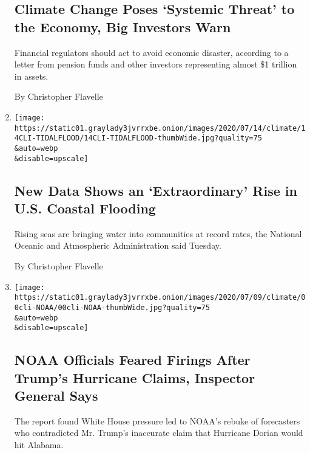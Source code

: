 \begin{enumerate}
  \hypertarget{climate-change-poses-systemic-threat-to-the-economy-big-investors-warn}{%
  \subsection{Climate Change Poses `Systemic Threat' to the Economy, Big
  Investors
  Warn}\label{climate-change-poses-systemic-threat-to-the-economy-big-investors-warn}}

  Financial regulators should act to avoid economic disaster, according
  to a letter from pension funds and other investors representing almost
  \$1 trillion in assets.

  By Christopher Flavelle
\item
  \href{/2020/07/14/climate/coastal-flooding-noaa.html}{}

  \texttt{[image: https://static01.graylady3jvrrxbe.onion/images/2020/07/14/climate/14CLI-TIDALFLOOD/14CLI-TIDALFLOOD-thumbWide.jpg?quality=75\\\&auto=webp\\\&disable=upscale]}

  \hypertarget{new-data-shows-an-extraordinary-rise-in-us-coastal-flooding}{%
  \subsection{New Data Shows an `Extraordinary' Rise in U.S. Coastal
  Flooding}\label{new-data-shows-an-extraordinary-rise-in-us-coastal-flooding}}

  Rising seas are bringing water into communities at record rates, the
  National Oceanic and Atmospheric Administration said Tuesday.

  By Christopher Flavelle
\item
  \href{/2020/07/09/climate/trump-hurricane-dorian-noaa.html}{}

  \texttt{[image: https://static01.graylady3jvrrxbe.onion/images/2020/07/09/climate/00cli-NOAA/00cli-NOAA-thumbWide.jpg?quality=75\\\&auto=webp\\\&disable=upscale]}

  \hypertarget{noaa-officials-feared-firings-after-trumps-hurricane-claims-inspector-general-says}{%
  \subsection{NOAA Officials Feared Firings After Trump's Hurricane
  Claims, Inspector General
  Says}\label{noaa-officials-feared-firings-after-trumps-hurricane-claims-inspector-general-says}}

  The report found White House pressure led to NOAA's rebuke of
  forecasters who contradicted Mr. Trump's inaccurate claim that
  Hurricane Dorian would hit Alabama.


\end{enumerate}
